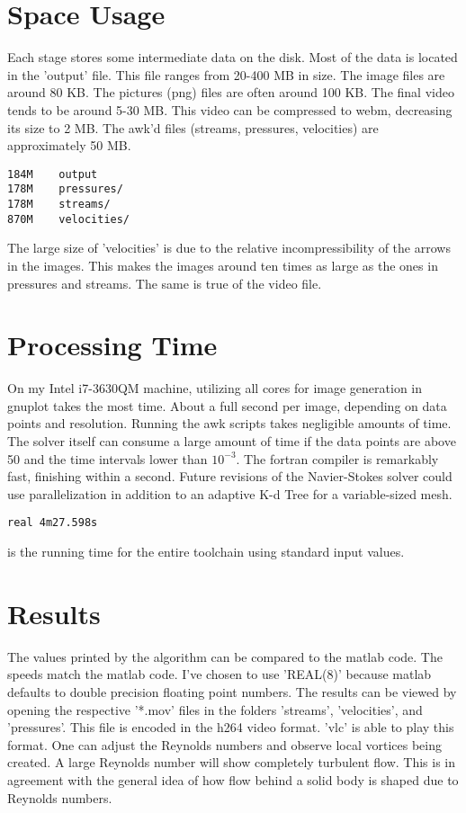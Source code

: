 \documentclass[listof=totoc]{report}
\begin{document}
\section{Space Usage}
Each stage stores some intermediate data on the disk. Most of the data is located in the 'output' file. This file ranges from 20-400 MB in size. The image files are around 80 KB. The pictures (png) files are often around 100 KB. The final video tends to be around 5-30 MB. This video can be compressed to webm, decreasing its size to 2 MB. The awk'd files (streams, pressures, velocities) are approximately 50 MB.

\begin{verbatim}
184M	output
178M	pressures/
178M	streams/
870M	velocities/
\end{verbatim}

The large size of 'velocities' is due to the relative incompressibility of the arrows in the images. This makes the images around ten times as large as the ones in pressures and streams. The same is true of the video file.

\section{Processing Time}
On my Intel i7-3630QM machine, utilizing all cores for image generation in gnuplot takes the most time. About a full second per image, depending on data points and resolution. Running the awk scripts takes negligible amounts of time. The solver itself can consume a large amount of time if the data points are above 50 and the time intervals lower than $10^{-3}$. The fortran compiler is remarkably fast, finishing within a second. Future revisions of the Navier-Stokes solver could use parallelization in addition to an adaptive K-d Tree for a variable-sized mesh.
\begin{verbatim}
real 4m27.598s
\end{verbatim} is the running time for the entire toolchain using standard input values.


\section{Results}
The values printed by the algorithm can be compared to the matlab code. The speeds match the matlab code. I've chosen to use 'REAL(8)' because matlab defaults to double precision floating point numbers. The results can be viewed by opening the respective '*.mov' files in the folders 'streams', 'velocities', and 'pressures'. This file is encoded in the h264 video format. 'vlc' is able to play this format. One can adjust the Reynolds numbers and observe local vortices being created. A large Reynolds number will show completely turbulent flow. This is in agreement with the general idea of how flow behind a solid body is shaped due to Reynolds numbers.
\end{document}
